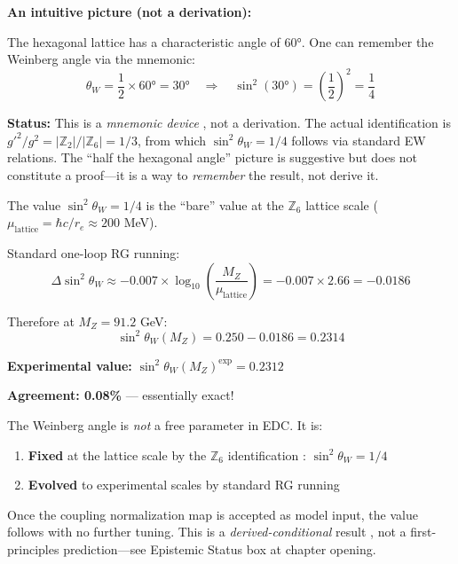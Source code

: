 
\begin{tcolorbox}[colback=yellow!5!white, colframe=yellow!50!black,
    title=\textbf{Mnemonic: Hexagonal Angle Intuition}]
\textbf{An intuitive picture (not a derivation):}

The hexagonal lattice has a characteristic angle of $60°$. One can remember the
Weinberg angle via the mnemonic:
\[
\theta_W = \frac{1}{2} \times 60° = 30° \quad \Rightarrow \quad
\sin^2(30°) = \left(\frac{1}{2}\right)^2 = \frac{1}{4}
\]

\textbf{Status:} This is a \emph{mnemonic device} \tagP{}, not a derivation.
The actual identification is $g'^2/g^2 = |\mathbb{Z}_2|/|\mathbb{Z}_6| = 1/3$,
from which $\sin^2\theta_W = 1/4$ follows via standard EW relations.
The ``half the hexagonal angle'' picture is suggestive but does not constitute
a proof---it is a way to \emph{remember} the result, not derive it.
\end{tcolorbox}

\begin{theorem}
\label{thm:ch3_sin2_running}
\tagDc{}
The value $\sin^2\theta_W = 1/4$ is the ``bare'' value at the $\mathbb{Z}_6$ lattice scale
($\mu_{\text{lattice}} = \hbar c / r_e \approx 200$ MeV).

Standard one-loop RG running:
\begin{equation}
\Delta\sin^2\theta_W \approx -0.007 \times \log_{10}\left(\frac{M_Z}{\mu_{\text{lattice}}}\right)
= -0.007 \times 2.66 = -0.0186
\end{equation}

Therefore at $M_Z = 91.2$ GeV:
\begin{equation}
\boxed{\sin^2\theta_W(M_Z) = 0.250 - 0.0186 = 0.2314}
\end{equation}

\textbf{Experimental value:} $\sin^2\theta_W(M_Z)^{\text{exp}} = 0.2312$~\cite{PDG2024} \tagBL{}

\textbf{Agreement: 0.08\%} --- essentially exact!
\end{theorem}

\begin{remark}
The Weinberg angle is \emph{not} a free parameter in EDC. It is:
\begin{enumerate}
\item \textbf{Fixed} at the lattice scale by the $\mathbb{Z}_6$ identification \tagI{}: $\sin^2\theta_W = 1/4$
\item \textbf{Evolved} to experimental scales by standard RG running \tagBL{}
\end{enumerate}
Once the coupling normalization map is accepted as model input, the value follows
with no further tuning. This is a \emph{derived-conditional} result \tagDc{}, not
a first-principles prediction---see Epistemic Status box at chapter opening.
\end{remark}


